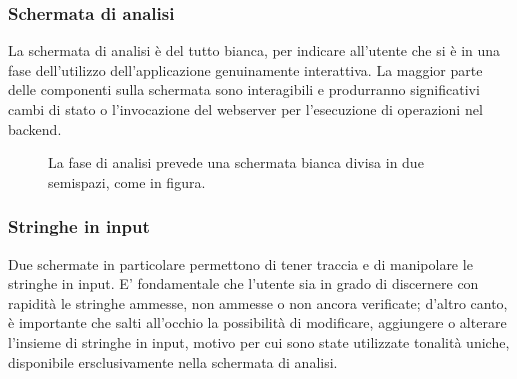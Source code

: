 \clearpage

\subsubsection{Schermata di analisi}

La schermata di analisi è del tutto bianca, per indicare all'utente che si è in una fase dell'utilizzo dell'applicazione genuinamente interattiva. La maggior parte delle componenti sulla schermata sono interagibili e produrranno significativi cambi di stato o l'invocazione del webserver per l'esecuzione di operazioni nel backend.

\begin{figure}[ht!]
    \centering
    \caption{La fase di analisi prevede una schermata bianca divisa in due semispazi, come in figura.}
    \label{fig:esempio}
\end{figure}

\clearpage

\subsubsection{Stringhe in input}

Due schermate in particolare permettono di tener traccia e di manipolare le stringhe in input. E' fondamentale che l'utente sia in grado di discernere con rapidità le stringhe ammesse, non ammesse o non ancora verificate; d'altro canto, è importante che salti all'occhio la possibilità di modificare, aggiungere o alterare l'insieme di stringhe in input, motivo per cui sono state utilizzate tonalità uniche, disponibile ersclusivamente nella schermata di analisi.

